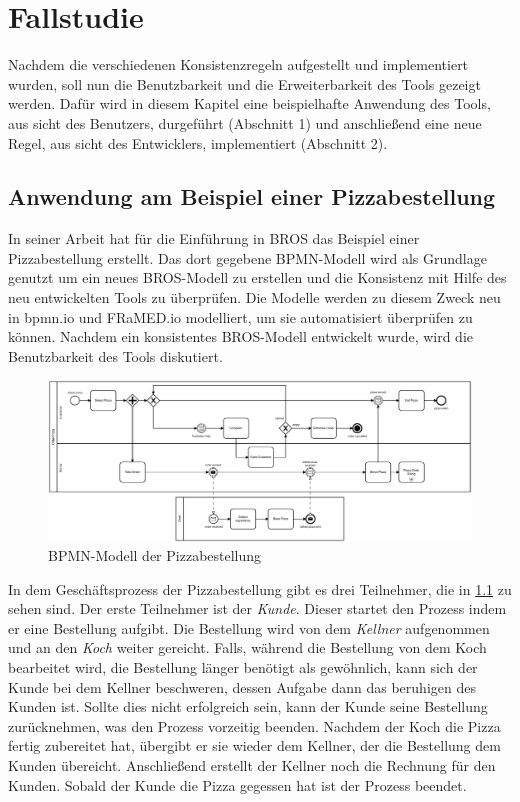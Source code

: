 \chapter{Fallstudie}
\label{chap:evaluation}

Nachdem die verschiedenen Konsistenzregeln aufgestellt und implementiert wurden, soll nun die Benutzbarkeit und die Erweiterbarkeit des Tools gezeigt werden.
Dafür wird in diesem Kapitel eine beispielhafte Anwendung des Tools, aus sicht des Benutzers, durgeführt (Abschnitt 1) und anschließend eine neue Regel, aus sicht des Entwicklers, implementiert (Abschnitt 2).

\section{Anwendung am Beispiel einer Pizzabestellung}

In seiner Arbeit hat \cite{Schoen} für die Einführung in BROS das Beispiel einer Pizzabestellung erstellt.
Das dort gegebene BPMN-Modell wird als Grundlage genutzt um ein neues BROS-Modell zu erstellen und die Konsistenz mit Hilfe des neu entwickelten Tools zu überprüfen.
Die Modelle werden zu diesem Zweck neu in bpmn.io und FRaMED.io modelliert, um sie automatisiert überprüfen zu können.
Nachdem ein konsistentes BROS-Modell entwickelt wurde, wird die Benutzbarkeit des Tools diskutiert.

\begin{figure}
    \centering
    \includegraphics[width=\textwidth,keepaspectratio]{../images/example/bpmn.pdf}%
    \caption{BPMN-Modell der Pizzabestellung}%
    \label{fig:pizzaBpmn}
\end{figure}

In dem Geschäftsprozess der Pizzabestellung gibt es drei Teilnehmer, die in \cref{fig:pizzaBpmn} zu sehen sind.
Der erste Teilnehmer ist der \emph{Kunde}.
Dieser startet den Prozess indem er eine Bestellung aufgibt.
Die Bestellung wird von dem \emph{Kellner} aufgenommen und an den \emph{Koch} weiter gereicht.
Falls, während die Bestellung von dem Koch bearbeitet wird, die Bestellung länger benötigt als gewöhnlich, kann sich der Kunde bei dem Kellner beschweren, dessen Aufgabe dann das beruhigen des Kunden ist.
Sollte dies nicht erfolgreich sein, kann der Kunde seine Bestellung zurücknehmen, was den Prozess vorzeitig beenden.
Nachdem der Koch die Pizza fertig zubereitet hat, übergibt er sie wieder dem Kellner, der die Bestellung dem Kunden übereicht.
Anschließend erstellt der Kellner noch die Rechnung für den Kunden.
Sobald der Kunde die Pizza gegessen hat ist der Prozess beendet.

